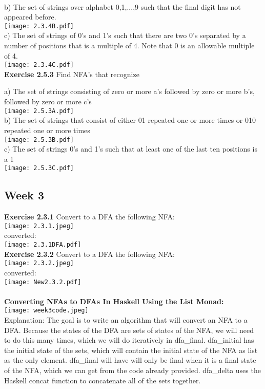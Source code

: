 \documentclass{article}
\theoremstyle{theorem}
\theoremstyle{definition}
\theoremstyle{remark}
\begin{document}
\\
b) The set of strings over alphabet {0,1,...,9} such that the final digit has not appeared before.
\\
\texttt{[image: 2.3.4B.pdf]}
\\
c) The set of strings of 0's and 1's such that there are two 0's separated by a number of positions that is a multiple of 4. Note that 0 is an allowable multiple of 4.
\\
\texttt{[image: 2.3.4C.pdf]}
\\


\textbf{Exercise 2.5.3} Find NFA's that recognize

a) The set of strings consisting of zero or more a's followed by zero or more b's, followed by zero or more c's
\\
\texttt{[image: 2.5.3A.pdf]}
\\

b) The set of strings that consist of either 01 repeated one or more times or 010 repeated one or more times
\\
\texttt{[image: 2.5.3B.pdf]}
\\
c) The set of strings 0's and 1's such that at least one of the last ten positions is a 1
\\
\texttt{[image: 2.5.3C.pdf]}


\subsection{Week 3}
\textbf{Exercise 2.3.1} Convert to a DFA the following NFA:
\\
\texttt{[image: 2.3.1.jpeg]}
\\
converted:
\\
\texttt{[image: 2.3.1DFA.pdf]}
\\
\textbf{Exercise 2.3.2} Convert to a DFA the following NFA:
\\
\texttt{[image: 2.3.2.jpeg]}
\\
converted:
\\
\texttt{[image: New2.3.2.pdf]}
\\

\\
\textbf{Converting NFAs to DFAs In Haskell Using the List Monad:}
\\
\/
\texttt{[image: week3code.jpeg]}
\\
Explanation:
The goal is to write an algorithm that will convert an NFA to a DFA. Because the states of the DFA are sets of states of the NFA, we will need to do this many times, which we will do iteratively in dfa\_final. dfa\_initial has the initial state of the sets, which will contain the initial state of the NFA as list as the only element. dfa\_final will have will only be final when it is a final state of the NFA, which we can get from the code already provided. dfa\_delta uses the Haskell concat function to concatenate all of the sets together.
\end{document}
